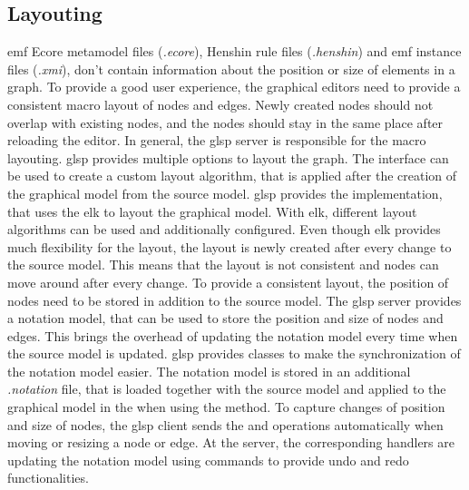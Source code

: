   \subsection{Layouting}
  \label{subsec:layouting}

  \ac{emf} Ecore metamodel files (\textit{.ecore}), Henshin rule files (\textit{.henshin}) and \ac{emf} instance files (\textit{.xmi}), don't contain information about the position or size of elements in a graph. \cite{emf,henshin-repo} To provide a good user experience, the graphical editors need to provide a consistent macro layout of nodes and edges. Newly created nodes should not overlap with existing nodes, and the nodes should stay in the same place after reloading the editor. In general, the \ac{glsp} server is responsible for the macro layouting. \cite{glsp-doc} \ac{glsp} provides multiple options to layout the graph. The interface  can be used to create a custom layout algorithm, that is applied after the creation of the graphical model from the source model. \ac{glsp} provides the  implementation, that uses the \ac{elk} to layout the graphical model. \cite{elk-engine} With \ac{elk}, different layout algorithms can be used and additionally configured. Even though \ac{elk} provides much flexibility for the layout, the layout is newly created after every change to the source model. This means that the layout is not consistent and nodes can move around after every change. To provide a consistent layout, the position of nodes need to be stored in addition to the source model. The \ac{glsp} server provides a notation model, that can be used to store the position and size of nodes and edges. \cite{glsp-repo} This brings the overhead of updating the notation model every time when the source model is updated. \ac{glsp} provides classes to make the synchronization of the notation model easier. The notation model is stored in an additional \textit{.notation} file, that is loaded together with the source model and applied to the graphical model in the  when using the  method. To capture changes of position and size of nodes, the \ac{glsp} client sends the  and  operations automatically when moving or resizing a node or edge. At the server, the corresponding handlers are updating the notation model using commands to provide undo and redo functionalities.

